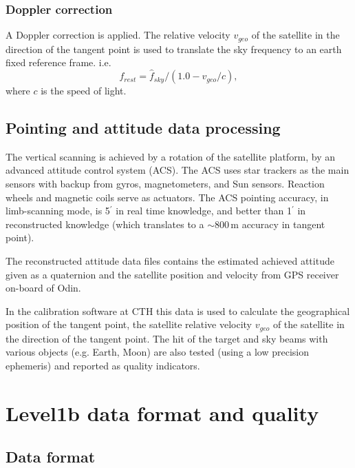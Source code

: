 

\subsection{Doppler correction}

A Doppler correction is applied.
The relative velocity \(v_{geo}\) of the satellite in the direction
of the tangent point is used to translate the sky frequency to an 
earth fixed reference frame. i.e.
\begin{equation}
f_{rest} = \hat{f}_{sky}/(1.0 - v_{geo}/c),
\end{equation}
where \(c\) is the speed of light.

\section{Pointing and attitude data processing}

The vertical scanning is achieved by a rotation of the satellite
platform, by an advanced attitude control system (ACS). 
The ACS uses star trackers as the main sensors with backup from gyros, 
magnetometers, and Sun sensors. Reaction wheels and magnetic coils serve as 
actuators. The ACS pointing accuracy, in limb-scanning mode, is 5\(^{'}\) in
real time knowledge, and better than 1\(^{'}\) in reconstructed knowledge
(which translates to a \(\sim\)800\,m accuracy in tangent point).

The reconstructed attitude data files contains the estimated
achieved attitude given as a quaternion and the satellite position   
and velocity from GPS receiver on-board of Odin.

In the calibration software at CTH this data is used to calculate
the geographical position of the tangent point, the satellite relative velocity 
\(v_{geo}\) of the satellite in the direction of the tangent point.
The hit of the target and sky beams with various objects (e.g. Earth, Moon) 
are also tested (using a low precision ephemeris)
and reported as quality indicators.


\chapter{Level1b data format and quality}



\section{Data format}

